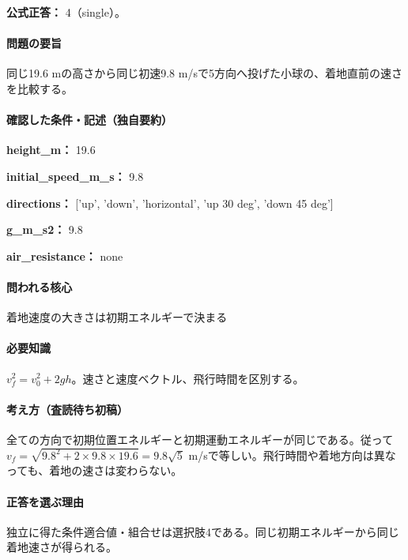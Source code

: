 \textbf{公式正答：} 4（single）。

\paragraph{問題の要旨} 同じ19.6 mの高さから同じ初速9.8 m/sで5方向へ投げた小球の、着地直前の速さを比較する。

\paragraph{確認した条件・記述（独自要約）}\mbox{}\par

\noindent\textbf{height\_m：} 19.6\par

\noindent\textbf{initial\_speed\_m\_s：} 9.8\par

\noindent\textbf{directions：} ['up', 'down', 'horizontal', 'up 30 deg', 'down 45 deg']\par

\noindent\textbf{g\_m\_s2：} 9.8\par

\noindent\textbf{air\_resistance：} none\par

\paragraph{問われる核心} 着地速度の大きさは初期エネルギーで決まる

\paragraph{必要知識} \(v_f^2=v_0^2+2gh\)。速さと速度ベクトル、飛行時間を区別する。

\paragraph{考え方（査読待ち初稿）} 全ての方向で初期位置エネルギーと初期運動エネルギーが同じである。従って\(v_f=\sqrt{9.8^2+2\times9.8\times19.6}=9.8\sqrt5\) m/sで等しい。飛行時間や着地方向は異なっても、着地の速さは変わらない。

\paragraph{正答を選ぶ理由} 独立に得た条件適合値・組合せは選択肢4である。同じ初期エネルギーから同じ着地速さが得られる。

